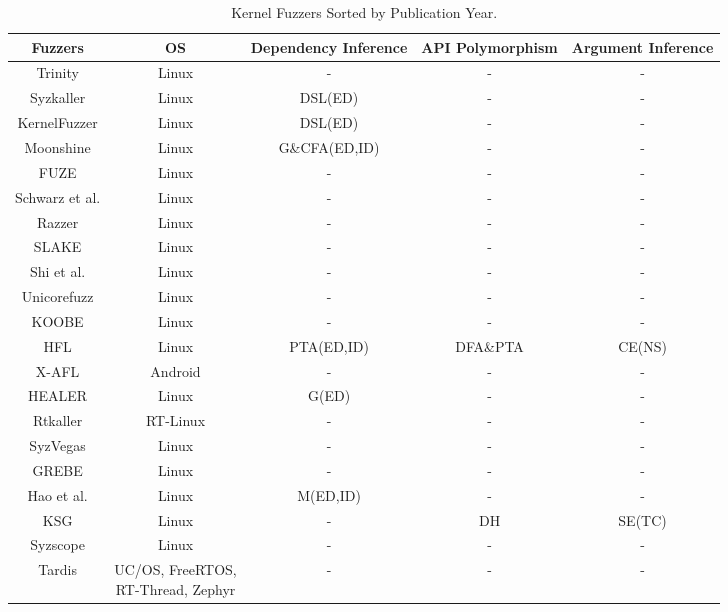 \begin{table}
  \scriptsize %
  \caption{Kernel Fuzzers Sorted by Publication Year.}
  \label{tab_kernel} 
  \vspace{-0.3cm}
  \begin{tabular}{ccccc}
  \toprule
  Fuzzers & OS & Dependency Inference & API Polymorphism & Argument Inference \\
  \midrule
  Trinity\cite{Trinity} & Linux & - & - & -\\
  Syzkaller\cite{Syzkaller} & Linux & DSL(ED) & - & - \\
  KernelFuzzer\cite{KernelFuzzer2016} & Linux & DSL(ED) & - & - \\
  Moonshine\cite{pailoor2018moonshine} & Linux & G\&CFA(ED,ID) & - & - \\
  FUZE\cite{wu2018fuze} & Linux & - & - & - \\
  Schwarz et al.\cite{schwarz2018automated} & Linux & - & - & - \\
  Razzer\cite{CONZZER2022context} & Linux & - & - & - \\
  SLAKE\cite{Liu2023LFuzz} & Linux & - & - & -\\
  Shi et al.\cite{shi2019industry} & Linux & - & - & - \\
  Unicorefuzz\cite{Unicorefuzz2019} & Linux & - & - & - \\
  KOOBE\cite{chen2020koobe} & Linux & - & - & - \\
  HFL\cite{kim2020hfl} & Linux & PTA(ED,ID) & DFA\&PTA & CE(NS) \\
  X-AFL\cite{liang2020xafl} & Android & - & - & - \\
  HEALER\cite{sun2021healer} & Linux & G(ED) & - & - \\
  Rtkaller\cite{shen2021rtkaller} & RT-Linux & - & - & -\\
  SyzVegas\cite{wang2021syzvegas} & Linux & - & - & -\\
  GREBE\cite{lin2022grebe} & Linux & - & - & - \\
  Hao et al.\cite{Hao2022DemystifyingTD} & Linux & M(ED,ID) & - &- \\
  KSG\cite{sun2022ksg} & Linux & - & DH & SE(TC) \\
  Syzscope\cite{zou2022syzscope} & Linux & - & - & - \\
  Tardis\cite{shen2022tardis} & \makecell{UC/OS, FreeRTOS, \\ RT-Thread, Zephyr} & - & - & - \\

\end{tabular}
\end{table}

